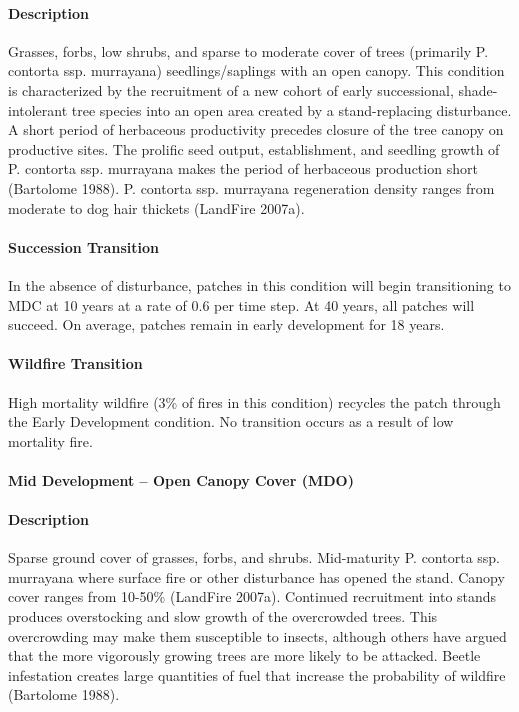 \paragraph{Description} Grasses, forbs, low shrubs, and sparse to moderate cover of trees (primarily P. contorta ssp. murrayana) seedlings/saplings with an open canopy. This condition is characterized by the recruitment of a new cohort of early successional, shade-intolerant tree species into an open area created by a stand-replacing disturbance. 
A short period of herbaceous productivity precedes closure of the tree canopy on productive sites. The prolific seed output, establishment, and seedling growth of P. contorta ssp. murrayana makes the period of herbaceous production short (Bartolome 1988). P. contorta ssp. murrayana regeneration density ranges from moderate to dog hair thickets (LandFire 2007a).


\paragraph{Succession Transition} In the absence of disturbance, patches in this condition will begin transitioning to MDC at 10 years at a rate of 0.6 per time step. At 40 years, all patches will succeed. On average, patches remain in early development for 18 years.

\paragraph{Wildfire Transition} High mortality wildfire (3\% of fires in this condition) recycles the patch through the Early Development condition. No transition occurs as a result of low mortality fire.

\noindent\hrulefill


\paragraph{Mid Development – Open Canopy Cover (MDO)}

\paragraph{Description} Sparse ground cover of grasses, forbs, and shrubs. Mid-maturity P. contorta ssp. murrayana where surface fire or other disturbance has opened the stand. Canopy cover ranges from 10-50\% (LandFire 2007a).
Continued recruitment into stands produces overstocking and slow growth of the overcrowded trees. This overcrowding may make them susceptible to insects, although others have argued that the more vigorously growing trees are more likely to be attacked. Beetle infestation creates large quantities of fuel that increase the probability of wildfire (Bartolome 1988).


